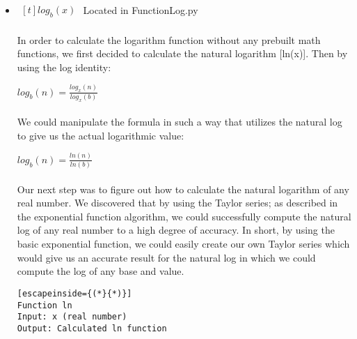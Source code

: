 \begin{itemize}
\begin{lstlisting}[escapeinside={(*}{*)}]
	sum (*$\leftarrow$*) 0
	i (*$\leftarrow$*) 1
	For i from 1 to 130 do
		sum (*$\leftarrow$*) sum + FunctionIntExponent(aabs, (i - 1))/FunctionFactorial((i - 1))
	Od
    If a < 0 then
    	sum (*$\leftarrow$*) 1 / sum
    Endif
    Return sum
Endif
            \end{lstlisting}

        \item $\begin{aligned}[t]
            log_{b}(x)
        \end{aligned}$
            Located in FunctionLog.py

            \paragraph{}
            In order to calculate the logarithm function without any prebuilt math functions, we first decided to calculate the natural logarithm [ln(x)]. Then by using the log identity:

            \begin{center}
                $log_b(n) = \frac{log_x(n)}{log_x(b)}$
            \end{center}

            \paragraph{}
            We could manipulate the formula in such a way that utilizes the natural log to give us the actual logarithmic value:

            \begin{center}
                $log_b(n) = \frac{ln(n)}{ln(b)}$
            \end{center}

            \paragraph{}
            Our next step was to figure out how to calculate the natural logarithm of any real number. We discovered that by using the Taylor series; as described in the exponential function algorithm, we could successfully compute the natural log of any real number to a high degree of accuracy. In short, by using the basic exponential function, we could easily create our own Taylor series which would give us an accurate result for the natural log in which we could compute the log of any base and value.

            \begin{lstlisting}[escapeinside={(*}{*)}]
Function ln
Input: x (real number)
Output: Calculated ln function


\end{lstlisting}
\end{itemize}

